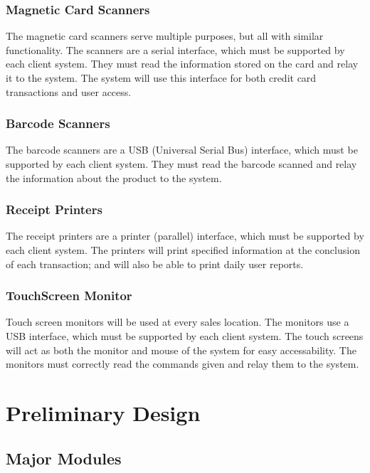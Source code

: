 \documentclass{report}
\begin{document}
    \subsubsection{Magnetic Card Scanners}
    The magnetic card scanners serve multiple purposes, but all with
    similar functionality.  The scanners are a serial interface,
    which must be supported by each client system.  They must read the
    information stored on the card and relay it to the system.
    The system will use this interface for both credit card
    transactions and user access.

    \subsubsection{Barcode Scanners}
    The barcode scanners are a USB (Universal Serial Bus)
    interface, which must be supported by each client system.  They must
    read the barcode scanned and relay the information about the
    product to the system.

    \subsubsection{Receipt Printers}
    The receipt printers are a printer (parallel) interface, which
    must be supported by each client system.  The printers
    will print specified information at the conclusion of each
    transaction; and will also be able to print daily user reports.

    \subsubsection{TouchScreen Monitor}
    Touch screen monitors will be used at every sales location.
    The monitors use a USB interface, which must be supported by
    each client system.  The touch screens will act as both the
    monitor and mouse of the system for easy accessability.  The
    monitors must correctly read the commands given and relay them
    to the system.

\section{Preliminary Design}

    \subsection{Major Modules}
\end{document}
